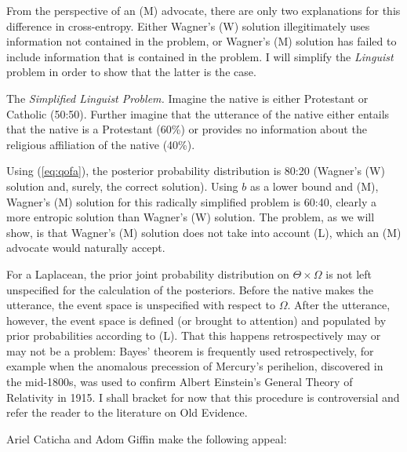 \documentclass[11pt]{article}
\begin{document}
From the perspective of an (M) advocate, there are only two
explanations for this difference in cross-entropy. Either Wagner's (W)
solution illegitimately uses information not contained in the problem,
or Wagner's (M) solution has failed to include information that is
contained in the problem. I will simplify the \emph{Linguist} problem
in order to show that the latter is the case.

\begin{quotex}
  The \emph{Simplified Linguist Problem.} Imagine the native is either
  Protestant or Catholic (50:50). Further imagine that the utterance
  of the native either entails that the native is a Protestant (60\%)
  or provides no information about the religious affiliation of the
  native (40\%).
\end{quotex}

Using (\ref{eq:qofa}), the posterior probability distribution is 80:20
(Wagner's (W) solution and, surely, the correct solution). Using $b$
as a lower bound and (M), Wagner's (M) solution for this radically
simplified problem is 60:40, clearly a more entropic solution than
Wagner's (W) solution. The problem, as we will show, is that Wagner's
(M) solution does not take into account (L), which an (M) advocate
would naturally accept.

For a Laplacean, the prior joint probability distribution on
$\Theta\times\Omega$ is not left unspecified for the calculation of
the posteriors. Before the native makes the utterance, the event space
is unspecified with respect to $\Omega$. After the utterance, however,
the event space is defined (or brought to attention) and populated by
prior probabilities according to (L). That this happens
retrospectively may or may not be a problem: Bayes' theorem is
frequently used retrospectively, for example when the anomalous
precession of Mercury's perihelion, discovered in the mid-1800s, was
used to confirm Albert Einstein's General Theory of Relativity in
1915. I shall bracket for now that this procedure is controversial and
refer the reader to the literature on Old Evidence.

Ariel Caticha and Adom Giffin make the following
appeal:

\end{document}
